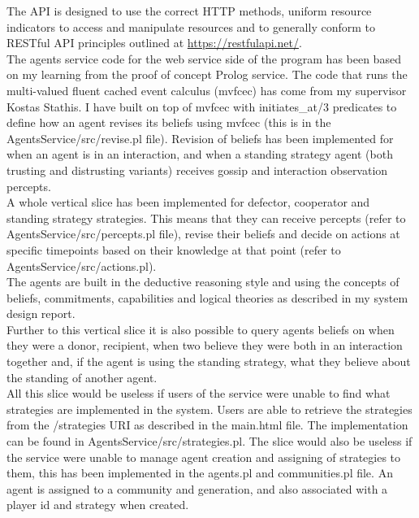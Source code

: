 \documentclass[]{final_report}
\begin{document}
The API is designed to use the correct HTTP methods, uniform resource indicators to access and manipulate resources and to generally conform to RESTful API principles outlined at \url{https://restfulapi.net/}.\\
The agents service code for the web service side of the program has been based on my learning from the proof of concept Prolog service. The code that runs the multi-valued fluent cached event calculus (mvfcec) has come from my supervisor Kostas Stathis. I have built on top of mvfcec with initiates\_at/3 predicates to define how an agent revises its beliefs using mvfcec (this is in the AgentsService/src/revise.pl file). Revision of beliefs has been implemented for when an agent is in an interaction, and when a standing strategy agent (both trusting and distrusting variants) receives gossip and interaction observation percepts.\\
A whole vertical slice has been implemented for defector, cooperator and standing strategy strategies. This means that they can receive percepts (refer to AgentsService/src/percepts.pl file), revise their beliefs and decide on actions at specific timepoints based on their knowledge at that point (refer to AgentsService/src/actions.pl).\\
The agents are built in the deductive reasoning style and using the concepts of beliefs, commitments, capabilities and logical theories as described in my system design report.\\
Further to this vertical slice it is also possible to query agents beliefs on when they were a donor, recipient, when two believe they were both in an interaction together and, if the agent is using the standing strategy, what they believe about the standing of another agent.\\
All this slice would be useless if users of the service were unable to find what strategies are implemented in the system. Users are able to retrieve the strategies from the /strategies URI as described in the main.html file. The implementation can be found in AgentsService/src/strategies.pl. The slice would also be useless if the service were unable to manage agent creation and assigning of strategies to them, this has been implemented in the agents.pl and communities.pl file. An agent is assigned to a community and generation, and also associated with a player id and strategy when created.
\end{document}
